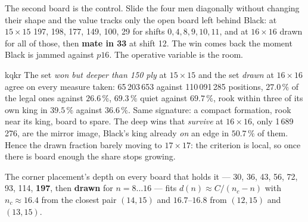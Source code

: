 \documentclass[10pt]{article}
\begin{document}
\medskip
\noindent
\begin{minipage}[t]{0.46\textwidth}
\end{minipage}\hfill
\begin{minipage}[t]{0.46\textwidth}
\end{minipage}

\medskip
\noindent
The second board is the control. Slide the four men diagonally without changing
their shape and the value tracks only the open board left behind Black: at
$15\times15$ 197, 198, 177, 149, 100, 29 for shifts $0,4,8,9,10,11$, and at
$16\times16$ drawn for all of those, then \textbf{mate in 33} at shift 12. The
win comes back the moment Black is jammed against $p16$. The operative variable
is the room.

\begin{result}[title={The class that flips is one class, and it can be recognised}]{kqkr}
The set \emph{won but deeper than 150 ply} at $15\times15$ and the set
\emph{drawn} at $16\times16$ agree on every measure taken: 65\,203\,653 against
110\,091\,285 positions, $27.0\,\%$ of the legal ones against $26.6\,\%$,
$69.3\,\%$ quiet against $69.7\,\%$, rook within three of its own king in
$39.5\,\%$ against $36.6\,\%$. Same signature: a compact formation, rook near
its king, board to spare. The deep wins that \emph{survive} at $16\times16$,
only 1\,689\,276, are the mirror image, Black's king already \emph{on} an edge
in $50.7\,\%$ of them. Hence the drawn fraction barely moving to $17\times17$:
the criterion is local, so once there is board enough the share stops
growing.
\end{result}

\noindent
The corner placement's depth on every board that holds it --- 30, 36, 43, 56,
72, 93, 114, \textbf{197}, then \textbf{drawn} for $n=8\ldots16$ --- fits
$d(n)\approx C/(n_c-n)$ with $n_c\approx16.4$ from the closest pair $(14,15)$
and $16.7$--$16.8$ from $(12,15)$ and $(13,15)$.
\end{document}

